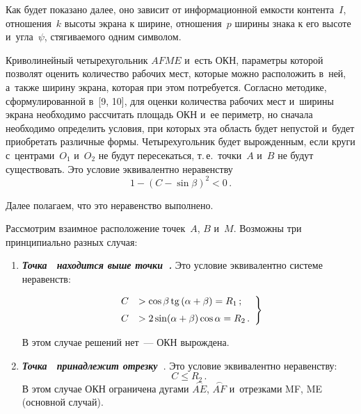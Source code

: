\begin{multicols}{2}
\begin{description}
\vspace*{-2pt}

\noindent
Как будет показано далее, оно зависит от информационной
емкости контента~$I$, отношения~$k$ высоты экрана к ширине,
отношения~$p$ ширины знака к его высоте и~угла~$\psi$, стя\-ги\-ва\-емо\-го одним
символом.
\end{description}

     Криволинейный четырехугольник $AFME$ и~есть ОКН, параметры
которой позволят оценить количество рабочих мест, которые можно
расположить в~ней, а~так\-же ширину экрана, которая при этом потребуется.
Согласно методике, сформулированной в~[9, 10], для оценки количества
рабочих мест и~ширины экрана необходимо рассчитать площадь ОКН и~ее
периметр, но сначала необходимо определить условия, при которых эта область
будет непустой и~будет приобретать различные формы. Четырехугольник
будет вырожденным, если круги с~центрами~$O_1$ и~$O_2$ не будут
пересекаться, т.\,е.\ точки~$A$ и~$B$ не будут существовать. Это условие
эквивалентно неравенству
     \begin{equation}
     1-\left (C-\sin \beta\right)^2<0\,.
     \label{e2-zat}
     \end{equation}


Далее полагаем, что это неравенство выполнено.

     Рассмотрим взаимное расположение точек~$A$, $B$ и~$M$. Возможны
три принципиально разных случая:
     \begin{enumerate}[1.]
\item {\bfseries\textit{Точка~{} находится выше точки~{}.}} Это условие
эквивалентно системе неравенств:

\vspace*{1pt}

\noindent
\begin{equation}\left.
\begin{array}{rl}
C&> \cos\beta \,\mathrm{tg}\,(\alpha+\beta) =R_1\,;\\[6pt]
C&> 2\sin(\alpha+\beta)\cos\alpha =R_2\,.
\end{array}
\right\}
\label{3-zat}
\end{equation}

\vspace*{-2pt}

\noindent
В этом случае решений нет~--- ОКН вырождена.

\item
{\bfseries\textit{Точка~{} принадлежит отрезку~{\boldmath{$[A, B]$}}}}.
Это условие
эквивалентно неравенству:
\begin{equation}
C\leq R_2\,.
\label{e4-zat}
\end{equation}
В этом случае ОКН ограничена дугами $\overset{\frown}{AE}$, $\overset{\frown}{AF}$
и~отрезками MF, ME (основной случай).


\end{enumerate}
\end{multicols}
